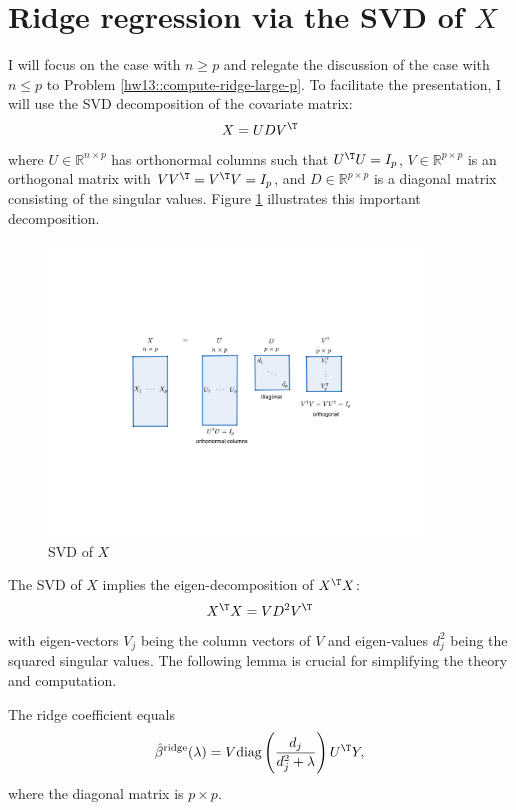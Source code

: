 \section{Ridge regression via the SVD of $X$}







I will focus on the case with $n \geq p$ and relegate the discussion of the case with $n \leq p$ to Problem \ref{hw13::compute-ridge-large-p}. 
To facilitate the presentation, I will use the SVD decomposition of the covariate matrix:
$$
X = UDV^{\T}
$$
where $U \in \mathbb{R}^{n\times p}$ has orthonormal columns such that $U^{\T} U = I_p$, $V \in \mathbb{R}^{p\times p}$ is an orthogonal matrix with $V V^{\T} = V^{\T} V = I_p$, and $D \in \mathbb{R}^{p\times p}$ is a diagonal matrix consisting of the singular values. Figure \ref{fig::svd-X} illustrates this important decomposition. 


\begin{figure}[h]
\centering 
\includegraphics[width = 0.9\textwidth]{figures/svd.pdf}
\caption{SVD of $X$}\label{fig::svd-X}
\end{figure}




The SVD of $X$ implies the eigen-decomposition of $X^{\T} X$:
$$
X^{\T} X = V D^2 V^{\T} 
$$
with eigen-vectors $V_j$ being the column vectors of $V$ and eigen-values $d_j^2$ being the squared singular values.
The following lemma is crucial for simplifying the theory and computation.

\begin{lemma}
\label{lemma::ridge-coefficient}
The ridge coefficient equals
$$
 \hat{\beta}^{\textup{ridge}}(\lambda)  = 
V\textup{diag}\left(  \frac{d_j}{d_j^2 + \lambda }  \right)  U^{\T} Y,
$$
where the diagonal matrix is $p\times p$. 
\end{lemma}


